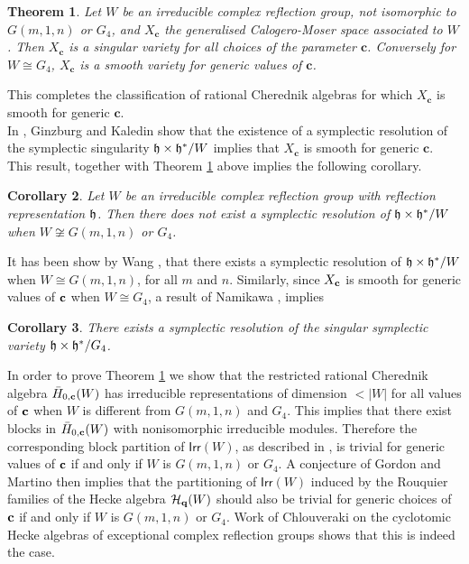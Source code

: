 \documentclass[a4apper,10pt]{amsart}
\newtheorem{thm}{Theorem}
\newtheorem{cor}[thm]{Corollary}
\theoremstyle{definition}
\numberwithin{thm}{section}
\newcommand{\Irr}{\mathsf{Irr}}
\begin{document}
\begin{thm}\label{thm:intro}
Let $W$ be an irreducible complex reflection group, not isomorphic to $G(m,1,n)$ or $G_4$, and $X_{\mathbf{c}}$  the generalised Calogero-Moser space associated to $W$. Then $X_{\mathbf{c}}$ is a singular variety for all choices of the parameter $\mathbf{c}$. Conversely for $W \cong G_4$, $X_{\mathbf{c}}$ is a smooth variety for generic values of $\mathbf{c}$.
\end{thm}

\noindent This completes the classification of rational Cherednik algebras for which $X_{\mathbf{c}}$ is smooth for generic $\mathbf{c}$. \\

In \cite[Corollary 1.21]{8}, Ginzburg and Kaledin show that the existence of a symplectic resolution of the symplectic singularity $\frak{h} \times \frak{h}^* / W$ implies that $X_{\mathbf{c}}$ is smooth for generic $\mathbf{c}$. This result, together with Theorem \ref{thm:intro} above implies the following corollary.
\begin{cor}
Let $W$ be an irreducible complex reflection group with reflection representation $\frak{h}$. Then there does not exist a symplectic resolution of $\frak{h} \times \frak{h}^* / W$ when $W \not\cong G(m,1,n)$ or $G_4$.
\end{cor}
It has been show by Wang \cite[Proposition 1]{wang}, that there exists a symplectic resolution of \mbox{$\frak{h} \times \frak{h}^* / W$} when $W \cong G(m,1,n)$, for all $m$ and $n$. Similarly, since $X_{\bf{c}}$ is smooth for generic values of $\bf{c}$ when $W \cong G_4$, a result of Namikawa \cite[Corollary 2.10]{9}, implies 
\begin{cor}
There exists a symplectic resolution of the singular symplectic variety $\frak{h} \times \frak{h}^* / G_4$.
\end{cor}
In order to prove Theorem \ref{thm:intro} we show that the restricted rational Cherednik algebra $\bar{H}_{0,\bf{c}}(W)$ has irreducible representations of dimension $< |W|$ for all values of $\bf{c}$ when $W$ is different from $G(m,1,n)$ and $G_4$. This implies that there exist blocks in $\bar{H}_{0,\bf{c}}(W)$ with nonisomorphic irreducible modules. Therefore the corresponding block partition of $\Irr(W)$, as described in \cite{12}, is trivial for generic values of $\bf{c}$ if and only if $W$ is $G(m,1,n)$ or $G_4$. A conjecture of Gordon and Martino \cite{12} then implies that the partitioning of $\Irr(W)$ induced by the Rouquier families of the Hecke algebra $\mathcal{H}_{\bf{q}}(W)$ should also be trivial for generic choices of $\bf{c}$ if and only if $W$ is $G(m,1,n)$ or $G_4$. Work of Chlouveraki \cite{13} on the cyclotomic Hecke algebras of exceptional complex reflection groups shows that this is indeed the case.
\end{document}
